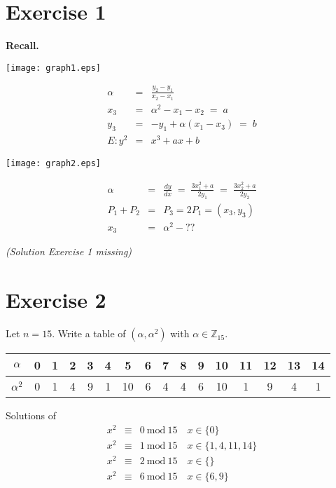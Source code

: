\documentclass[a4paper]{scrreprt}
\newcommand\Z{\mathbb Z}
\renewcommand\mod{\ \mathrm{mod}\:}
\begin{document}
\section*{Exercise 1}

\textbf{Recall.}

\begin{center}
    \texttt{[image: graph1.eps]}
\end{center}

\begin{eqnarray*}
    \alpha &=& \frac{y_2-y_1}{x_2-x_1}\\
    x_3 &=& \alpha^2 - x_1 - x_2 \;=\; a \\
    y_3 &=& -y_1+\alpha(x_1-x_3)\;=\;b\\
    E: y^2 &=& x^3 + ax + b
\end{eqnarray*}

\begin{center}
    \texttt{[image: graph2.eps]}
\end{center}

\begin{eqnarray*}
    \alpha &=& \frac{dy}{dx} \;=\; \frac{3x_1^2+a}{2y_1}\;=\; \frac{3x_2^2+a}{2y_2}\\
    P_1+P_2 &=& P_3 = 2P_1 = (x_3,y_3)\\
    x_3 &=& \alpha^2 - ??
\end{eqnarray*}

\textit{(Solution Exercise 1 missing)}

\section*{Exercise 2}

Let $n=15$. Write a table of $(\alpha, \alpha^2)$ with $\alpha\in\Z_{15}$.

\begin{center}
    \begin{tabular}{c|c|c|c|c|c|c|c|c|c|c|c|c|c|c|c}
        $\alpha$ & 0 & 1 & 2 & 3 & 4 & 5 & 6 & 7 & 8 & 9 & 10 & 11 & 12 & 13 & 14 \\
        \hline
        $\alpha^2$ & 0 & 1 & 4 & 9 & 1 & 10 & 6 & 4 & 4 & 6 & 10 & 1 & 9 & 4 & 1
    \end{tabular}
\end{center}

Solutions of
\begin{eqnarray*}
    x^2 &\equiv& 0\mod15 \quad x\in\{0\}\\
    x^2 &\equiv& 1\mod15 \quad x\in\{1,4,11,14\}\\
    x^2 &\equiv& 2\mod15 \quad x\in\{\}\\
    x^2 &\equiv& 6\mod15 \quad x\in\{6,9\}\\
\end{eqnarray*}
\end{document}
